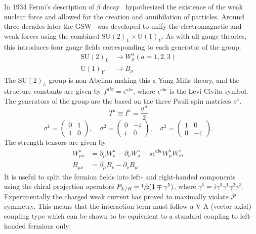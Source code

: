 In 1934 Fermi's description of $\beta$ decay~\cite{Fermi1934} hypothesized the existence of the weak nuclear force and allowed for the creation and annihilation of particles.
Around three decades later the \Gls{GSW}~\cite{Glashow1961, Weinberg1967,Salam1964} was developed to unify the electromagnetic and weak forces using the combined $\text{SU}(2)_L \times \text{U}(1)_Y$.
As with all gauge theories, this introduces four gauge fields corresponding to each generator of the group.
\begin{align}
    \text{SU}(2)_L & \rightarrow W_\mu^a(a = 1, 2, 3) \\
    \text{U}(1)_Y  & \rightarrow B_\mu
\end{align}
The $\text{SU}(2)_L$ group is non-Abelian making this a Yang-Mills theory, and the structure constants are given by $f^{abc} = \epsilon^{abc}$, where $\epsilon^{abc}$ is the Levi-Civita symbol.
The generators of the group are the based on the three Pauli spin matrices $\sigma^i$.
\begin{equation}
    \label{eq:su2_generators}
    T^a \equiv I^a = \frac{\sigma^a}{2}
\end{equation}
\begin{equation}
    \sigma^1 = \begin{pmatrix} 0 & 1 \\ 1 & 0 \end{pmatrix},
    \quad \sigma^2 = \begin{pmatrix} 0 & -i \\ i & 0 \end{pmatrix},
    \quad \sigma^3 = \begin{pmatrix} 1 & 0 \\ 0 & -1 \end{pmatrix}.
    \label{eq:pauli_matrices}
\end{equation}
The strength tensors are given by
\begin{align}
    \label{eq:ew_field_strength_tensors}
    W_{\mu\nu}^a & = \partial_\mu W_\nu^a - \partial_\nu W_\mu^a - s \epsilon^{abc} W_\mu^b W_\nu^c, \\
    B_{\mu\nu}   & = \partial_\mu B_\nu - \partial_\nu B_\mu.
\end{align}
It is useful to split the fermion fields into left- and right-handed components using the chiral projection operators $P_{L/R} = \sfrac{1}{2} (1 \mp \gamma^5)$, where $\gamma^5 = i \gamma^0 \gamma^1 \gamma^2 \gamma^3$.
Experimentally the charged weak current has proved to maximally violate $\mathcal{P}$ symmetry.
This means that the interaction term must follow a V-A (vector-axial) coupling type which can be shown to be equivalent to a standard coupling to left-handed fermions only:

